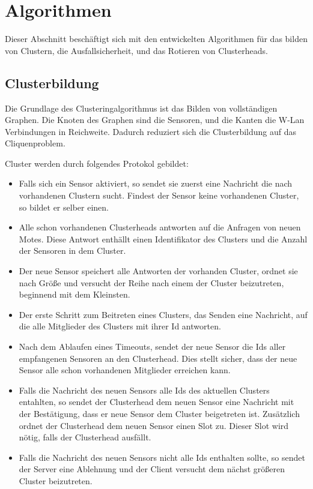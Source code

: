 \section{Algorithmen} \label{sec:algo}
Dieser Abschnitt besch\"aftigt sich mit den entwickelten Algorithmen f\"ur das bilden von Clustern, die Ausfallsicherheit, und das Rotieren von Clusterheads.

\subsection{Clusterbildung}
Die Grundlage des Clusteringalgorithmus ist das Bilden von vollst\"andigen Graphen.
Die Knoten des Graphen sind die Sensoren, und die Kanten die W-Lan Verbindungen in Reichweite.
Dadurch reduziert sich die Clusterbildung auf das Cliquenproblem.

Cluster werden durch folgendes Protokol gebildet:
\begin{itemize}
\item Falls sich ein Sensor aktiviert, so sendet sie zuerst eine Nachricht die nach vorhandenen Clustern sucht. Findest der Sensor keine vorhandenen Cluster, so bildet er selber einen.
\item Alle schon vorhandenen Clusterheads antworten auf die Anfragen von neuen Motes. Diese Antwort enth\"allt einen Identifikator des Clusters und die Anzahl der Sensoren in dem Cluster.
\item Der neue Sensor speichert alle Antworten der vorhanden Cluster, ordnet sie nach Gr\"o\ss e und versucht der Reihe nach einem der Cluster beizutreten, beginnend mit dem Kleinsten.
\item Der erste Schritt zum Beitreten eines Clusters, das Senden eine Nachricht, auf die alle Mitglieder des Clusters mit ihrer Id antworten.
\item Nach dem Ablaufen eines Timeouts, sendet der neue Sensor die Ids aller empfangenen Sensoren an den Clusterhead. Dies stellt sicher, dass der neue Sensor alle schon vorhandenen Mitglieder erreichen kann.
\item Falls die Nachricht des neuen Sensors alle Ids des aktuellen Clusters entahlten, so sendet der Clusterhead dem neuen Sensor eine Nachricht mit der Best\"atigung, dass er neue Sensor dem Cluster beigetreten ist. Zus\"atzlich ordnet der Clusterhead dem neuen Sensor einen Slot zu. Dieser Slot wird n\"otig, falls der Clusterhead ausf\"allt.
\item Falls die Nachricht des neuen Sensors nicht alle Ids enthalten sollte, so sendet der Server eine Ablehnung und der Client versucht dem n\"achst gr\"o\ss eren Cluster beizutreten.
\end{itemize}

